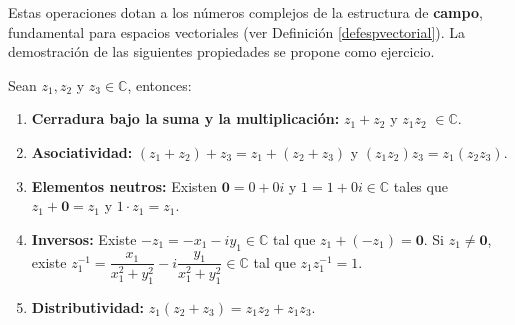 Estas operaciones dotan a los números complejos de la estructura de \textbf{campo}, fundamental para espacios vectoriales (ver Definición \ref{defespvectorial}). La demostración de las siguientes propiedades se propone como ejercicio.

\begin{theorem}
Sean $z_1,z_2$ y $z_3 \in \mathbb{C}$, entonces:
\begin{enumerate}[$1.$]
\item \textbf{Cerradura bajo la suma y la multiplicación:} $z_1+z_2$ y $z_1z_2$ $\in \mathbb{C}$.
\item \textbf{Asociatividad:} $\left(z_1+z_2 \right)+z_3=z_1+\left( z_2+z_3 \right)$ y $\left( z_1z_2 \right)z_3=z_1\left( z_2z_3 \right)$. 
\item \textbf{Elementos neutros:} Existen $\mathbf{0}=0+0i$ y $1=1+0i \in \mathbb{C}$ tales que $z_1+\mathbf{0}=z_1$ y $1 \cdot z_1=z_1$.
\item \textbf{Inversos:} Existe $-z_1=-x_1-iy_1 \in \mathbb{C}$ tal que $z_1+(-z_1)=\mathbf{0}$. Si $z_1\neq \mathbf{0}$, existe $z_1^{-1}=\dfrac{x_1}{x_1^2+y_1^2}-i\dfrac{y_1}{x_1^2+y_1^2}\in \mathbb{C}$ tal que $z_1z_1^{-1}=1$.
\item \textbf{Distributividad:} $z_1(z_2+z_3)=z_1z_2+z_1z_3$.
\end{enumerate}
\end{theorem}

